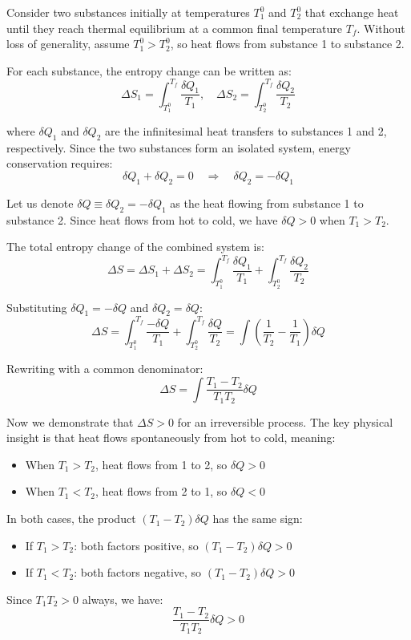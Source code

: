 \documentclass[10pt,twocoloumn]{article}
\begin{document}
Consider two substances initially at temperatures $T_1^0$ and $T_2^0$ that exchange heat until they reach thermal equilibrium at a common final temperature $T_f$. Without loss of generality, assume $T_1^0 > T_2^0$, so heat flows from substance 1 to substance 2.

For each substance, the entropy change can be written as:
\begin{equation}\Delta S_1 = \int_{T_1^0}^{T_f} \frac{\delta Q_1}{T_1}, \quad \Delta S_2 = \int_{T_2^0}^{T_f} \frac{\delta Q_2}{T_2}\end{equation}

where $\delta Q_1$ and $\delta Q_2$ are the infinitesimal heat transfers to substances 1 and 2, respectively. Since the two substances form an isolated system, energy conservation requires:
\begin{equation}\delta Q_1 + \delta Q_2 = 0 \quad \Rightarrow \quad \delta Q_2 = -\delta Q_1\end{equation}

Let us denote $\delta Q \equiv \delta Q_2 = -\delta Q_1$ as the heat flowing from substance 1 to substance 2. Since heat flows from hot to cold, we have $\delta Q > 0$ when $T_1 > T_2$.

The total entropy change of the combined system is:
\begin{equation}\Delta S = \Delta S_1 + \Delta S_2 = \int_{T_1^0}^{T_f} \frac{\delta Q_1}{T_1} + \int_{T_2^0}^{T_f} \frac{\delta Q_2}{T_2}\end{equation}

Substituting $\delta Q_1 = -\delta Q$ and $\delta Q_2 = \delta Q$:
\begin{equation}\Delta S = \int_{T_1^0}^{T_f} \frac{-\delta Q}{T_1} + \int_{T_2^0}^{T_f} \frac{\delta Q}{T_2} = \int \left(\frac{1}{T_2} - \frac{1}{T_1}\right) \delta Q\end{equation}

Rewriting with a common denominator:
\begin{equation}\Delta S = \int \frac{T_1 - T_2}{T_1 T_2} \delta Q\end{equation}

Now we demonstrate that $\Delta S > 0$ for an irreversible process. The key physical insight is that heat flows spontaneously from hot to cold, meaning:
\begin{itemize}
\item When $T_1 > T_2$, heat flows from 1 to 2, so $\delta Q > 0$
\item When $T_1 < T_2$, heat flows from 2 to 1, so $\delta Q < 0$
\end{itemize}
In both cases, the product $(T_1 - T_2)\delta Q$ has the same sign:
\begin{itemize}
\item If $T_1 > T_2$: both factors positive, so $(T_1 - T_2)\delta Q > 0$
\item If $T_1 < T_2$: both factors negative, so $(T_1 - T_2)\delta Q > 0$
\end{itemize}
Since $T_1 T_2 > 0$ always, we have:
\begin{equation}\frac{T_1 - T_2}{T_1 T_2} \delta Q > 0\end{equation}
\end{document}

